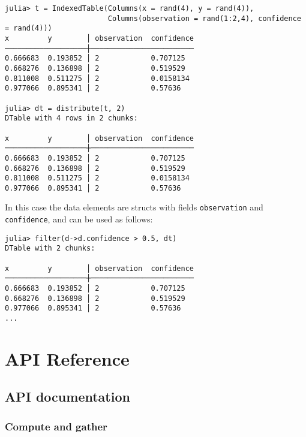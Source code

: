 \documentclass{memoir}
\begin{document}
\begin{verbatim}
julia> t = IndexedTable(Columns(x = rand(4), y = rand(4)),
                        Columns(observation = rand(1:2,4), confidence = rand(4)))
x         y        │ observation  confidence
───────────────────┼────────────────────────
0.666683  0.193852 │ 2            0.707125
0.668276  0.136898 │ 2            0.519529
0.811008  0.511275 │ 2            0.0158134
0.977066  0.895341 │ 2            0.57636

julia> dt = distribute(t, 2)
DTable with 4 rows in 2 chunks:

x         y        │ observation  confidence
───────────────────┼────────────────────────
0.666683  0.193852 │ 2            0.707125
0.668276  0.136898 │ 2            0.519529
0.811008  0.511275 │ 2            0.0158134
0.977066  0.895341 │ 2            0.57636
\end{verbatim}



In this case the data elements are structs with fields \texttt{observation} and \texttt{confidence}, and can be used as follows:




\begin{verbatim}
julia> filter(d->d.confidence > 0.5, dt)
DTable with 2 chunks:

x         y        │ observation  confidence
───────────────────┼────────────────────────
0.666683  0.193852 │ 2            0.707125
0.668276  0.136898 │ 2            0.519529
0.977066  0.895341 │ 2            0.57636
...
\end{verbatim}



\part{API Reference}




\hypertarget{15820397295884952734}{}


\chapter{API documentation}



\hypertarget{9625693945216481266}{}


\section{Compute and gather}
\end{document}
